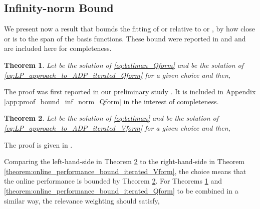 \documentclass[journal]{IEEEtran}
\newtheorem{theorem}{Theorem}[section]
\begin{document}
\vspace{0.2cm}

\subsection{Infinity-norm Bound}  \label{sec:bounds_fitting_infty}


We present now a result that bounds the fitting of  or  relative to  or , by how close  or  is to the span of the basis functions.
These bound were reported in \cite{beuchat_2016_ECC_PWMQ} and \cite{boyd_iteratedBellman} and are included here for completeness.

\vspace{0.1cm}

\begin{theorem} \label{theorem:inf_norm_bound_iterated_Qform}
	Let  be the solution of \eqref{eq:bellman_Qform} and  be the solution of \eqref{eq:LP_approach_to_ADP_iterated_Qform} for a given choice  and  then,
	
	
\end{theorem}
\vspace{-0.1cm}
The proof was first reported in our preliminary study \cite[Theorem 4.1]{beuchat_2016_ECC_PWMQ}. It is included in Appendix \ref{app:proof_bound_inf_norm_Qform} in the interest of completeness.

\vspace{0.1cm}

\begin{theorem} \label{theorem:inf_norm_bound_iterated_Vform}
	Let  be the solution of \eqref{eq:bellman} and  be the solution of \eqref{eq:LP_approach_to_ADP_iterated_Vform} for a given choice  and  then,
	
\end{theorem}
\vspace{0.1cm}
The proof is given in \cite[\S 4.3]{boyd_iteratedBellman}.

\vspace{0.2cm}

Comparing the left-hand-side in Theorem \ref{theorem:inf_norm_bound_iterated_Vform} to the right-hand-side in Theorem \ref{theorem:online_performance_bound_iterated_Vform}, the choice  means that the online performance is bounded by Theorem \ref{theorem:inf_norm_bound_iterated_Vform}. For Theorems \ref{theorem:inf_norm_bound_iterated_Qform} and \ref{theorem:online_performance_bound_iterated_Qform} to be combined in a similar way, the relevance weighting  should satisfy,
	
\end{document}
